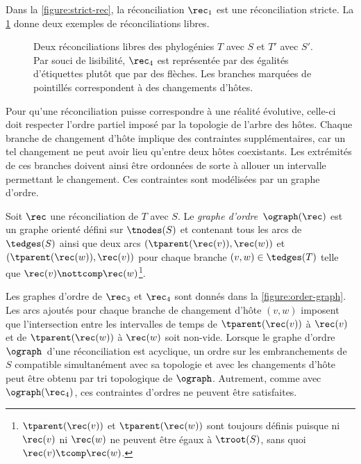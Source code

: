 Dans la \cref{figure:strict-rec}, la réconciliation \(\rec_1\) est une réconciliation stricte.
La \cref{figure:free-rec} donne deux exemples de réconciliations libres.

\begin{figure}[htb]
    \capstart
    \centering
    
    \caption{
        Deux réconciliations libres des phylogénies \(T\) avec \(S\) et \(T'\) avec \(S'\).
        Par souci de lisibilité, \(\rec_4\) est représentée par des égalités d’étiquettes plutôt que par des flèches.
        Les branches marquées de pointillés correspondent à des changements d’hôtes.
    }
    \label{figure:free-rec}
\end{figure}

Pour qu’une réconciliation puisse correspondre à une réalité évolutive, celle-ci doit respecter l’ordre partiel imposé par la topologie de l’arbre des hôtes.
Chaque branche de changement d’hôte implique des contraintes supplémentaires, car un tel changement ne peut avoir lieu qu’entre deux hôtes coexistants.
Les extrémités de ces branches doivent ainsi être ordonnées de sorte à allouer un intervalle permettant le changement.
Ces contraintes sont modélisées par un graphe d’ordre.

\begin{definition}\label{definition:rec-order}
    Soit \(\rec\) une réconciliation de \(T\) avec \(S\).
    Le \emph{graphe d’ordre}~\(\ograph(\rec)\) est un graphe orienté
    défini sur \(\tnodes(S)\)
    et contenant tous les arcs de \(\tedges(S)\)
    ainsi que deux arcs \((\tparent(\rec(v)), \rec(w))\) et \((\tparent(\rec(w)), \rec(v))\)
    pour chaque branche \((v, w) \in \tedges(T)\) telle que \(\rec(v) \nottcomp \rec(w)\)\footnote{
        \(\tparent(\rec(v))\) et \(\tparent(\rec(w))\) sont toujours définis puisque ni \(\rec(v)\) ni \(\rec(w)\) ne peuvent être égaux à \(\troot(S)\), sans quoi \(\rec(v) \tcomp \rec(w)\).
    }.
\end{definition}

Les graphes d’ordre de \(\rec_3\) et \(\rec_4\) sont donnés dans la \cref{figure:order-graph}.
Les arcs ajoutés pour chaque branche de changement d’hôte \((v, w)\) imposent que l’intersection entre les intervalles de temps de \(\tparent(\rec(v))\) à \(\rec(v)\) et de \(\tparent(\rec(w))\) à \(\rec(w)\) soit non-vide.
Lorsque le graphe d’ordre \(\ograph\)\, d’une réconciliation est acyclique, un ordre sur les embranchements de \(S\) compatible simultanément avec sa topologie et avec les changements d’hôte peut être obtenu par tri topologique de \(\ograph\).
Autrement, comme avec \(\ograph(\rec_4)\), ces contraintes d’ordres ne peuvent être satisfaites.

